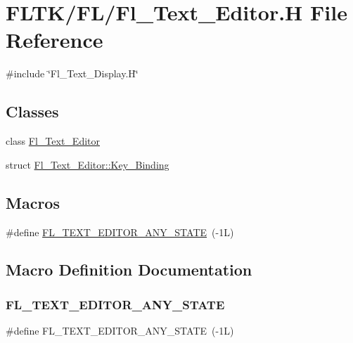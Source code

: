 \hypertarget{_fl___text___editor_8_h}{}\section{F\+L\+T\+K/\+F\+L/\+Fl\+\_\+\+Text\+\_\+\+Editor.H File Reference}
\label{_fl___text___editor_8_h}
{\ttfamily \#include \char`\"{}Fl\+\_\+\+Text\+\_\+\+Display.\+H\char`\"{}}\newline
\subsection*{Classes}
\begin{DoxyCompactItemize}
\item 
class \hyperlink{class_fl___text___editor}{Fl\+\_\+\+Text\+\_\+\+Editor}
\item 
struct \hyperlink{struct_fl___text___editor_1_1_key___binding}{Fl\+\_\+\+Text\+\_\+\+Editor\+::\+Key\+\_\+\+Binding}
\end{DoxyCompactItemize}
\subsection*{Macros}
\begin{DoxyCompactItemize}
\item 
\#define \hyperlink{_fl___text___editor_8_h_ad8071fe7b8bb3b9cf78dfa99da2ffa76}{F\+L\+\_\+\+T\+E\+X\+T\+\_\+\+E\+D\+I\+T\+O\+R\+\_\+\+A\+N\+Y\+\_\+\+S\+T\+A\+TE}~(-\/1\+L)
\end{DoxyCompactItemize}


\subsection{Macro Definition Documentation}
\mbox{\label{_fl___text___editor_8_h_ad8071fe7b8bb3b9cf78dfa99da2ffa76}} 
\subsubsection{\texorpdfstring{F\+L\+\_\+\+T\+E\+X\+T\+\_\+\+E\+D\+I\+T\+O\+R\+\_\+\+A\+N\+Y\+\_\+\+S\+T\+A\+TE}{FL\_TEXT\_EDITOR\_ANY\_STATE}}
{\footnotesize\ttfamily \#define F\+L\+\_\+\+T\+E\+X\+T\+\_\+\+E\+D\+I\+T\+O\+R\+\_\+\+A\+N\+Y\+\_\+\+S\+T\+A\+TE~(-\/1\+L)}

